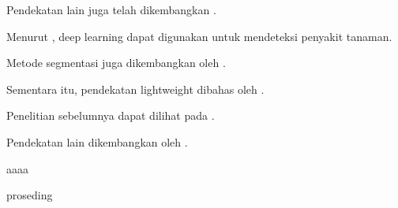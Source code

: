 Pendekatan lain juga telah dikembangkan
\parencite{siregar2006}.

Menurut \parencite{santoso2024deep}, deep learning dapat digunakan
untuk mendeteksi penyakit tanaman.

Metode segmentasi juga dikembangkan oleh
\parencite{santoso2024semantic}.

Sementara itu, pendekatan lightweight dibahas oleh
\parencite{santoso2024lightweight}.

Penelitian sebelumnya dapat dilihat pada
\parencite{santoso2023unet}.

Pendekatan lain dikembangkan oleh
\textcite{wijaya2024cnn}.

aaaa \parencite{todd2005groundwater}

proseding \parencite{neuman1980adjoint}

